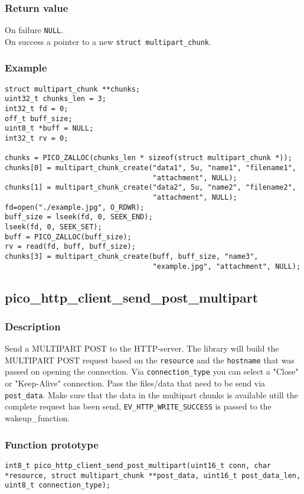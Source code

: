 \subsubsection*{Return value}
On failure \texttt{NULL}.
\\On success a pointer to a new \texttt{struct multipart\_chunk}.
\subsubsection*{Example}
\begin{verbatim}
struct multipart_chunk **chunks;
uint32_t chunks_len = 3;
int32_t fd = 0;
off_t buff_size;
uint8_t *buff = NULL;
int32_t rv = 0;

chunks = PICO_ZALLOC(chunks_len * sizeof(struct multipart_chunk *));
chunks[0] = multipart_chunk_create("data1", 5u, "name1", "filename1",
                                   "attachment", NULL);
chunks[1] = multipart_chunk_create("data2", 5u, "name2", "filename2",
                                   "attachment", NULL);
fd=open("./example.jpg", O_RDWR);
buff_size = lseek(fd, 0, SEEK_END);
lseek(fd, 0, SEEK_SET);
buff = PICO_ZALLOC(buff_size);
rv = read(fd, buff, buff_size);
chunks[3] = multipart_chunk_create(buff, buff_size, "name3",
                                   "example.jpg", "attachment", NULL);
\end{verbatim}



\subsection{pico\_http\_client\_send\_post\_multipart}

\subsubsection*{Description}
Send a MULTIPART POST to the HTTP-server. The library will build the MULTIPART POST request based on the \texttt{resource} and the \texttt{hostname} that was passed on opening the connection. Via \texttt{connection\_type} you can select a "Close" or "Keep-Alive" connection. Pass the files/data that need to be send via \texttt{post\_data}. Make sure that the data in the multipart chunks is available utill the complete request has been send, \texttt{EV\_HTTP\_WRITE\_SUCCESS} is passed to the wakeup\_function.

\subsubsection*{Function prototype}
\texttt{int8\_t pico\_http\_client\_send\_post\_multipart(uint16\_t conn, char *resource, struct multipart\_chunk **post\_data, uint16\_t post\_data\_len, uint8\_t connection\_type);}

